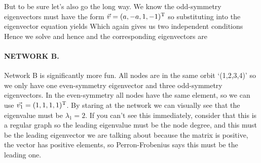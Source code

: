 But to be sure let's also go the long way. We know the odd-symmetry eigenvectors must have the form $\vec{v}=(a,-a,1,-1)^{\rm T}$ so substituting into the eigenvector equation yields 
Which again gives us two independent conditions 
Hence we solve 
and hence 
and the corresponding eigenvectors are

\paragraph{NETWORK B. }
Network B is significantly more fun. All nodes are in the same orbit `(1,2,3,4)' so we only have one even-symmetry eigenvector and three odd-symmetry eigenvectors. In the even-symmetry all nodes have the same element, so we can use $\vec{v_1}=(1,1,1,1)^{\rm T}$. By staring at the network we can visually see that the eigenvalue must be $\lambda_1=2$. If you can't see this immediately, consider that this is a regular graph so the leading eigenvalue must be the node degree, and this must be the leading eigenvector we are talking about because the matrix is positive, the vector has positive elements, so Perron-Frobenius says this must be the leading one.

